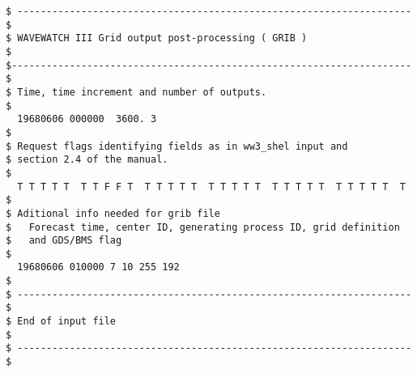 \begin{verbatim}
$ -------------------------------------------------------------------- $
$ WAVEWATCH III Grid output post-processing ( GRIB )                   $
$--------------------------------------------------------------------- $
$ Time, time increment and number of outputs.
$
  19680606 000000  3600. 3
$
$ Request flags identifying fields as in ww3_shel input and
$ section 2.4 of the manual.
$
  T T T T T  T T F F T  T T T T T  T T T T T  T T T T T  T T T T T  T
$
$ Aditional info needed for grib file
$   Forecast time, center ID, generating process ID, grid definition
$   and GDS/BMS flag
$
  19680606 010000 7 10 255 192
$
$ -------------------------------------------------------------------- $
$ End of input file                                                    $
$ -------------------------------------------------------------------- $
\end{verbatim}
